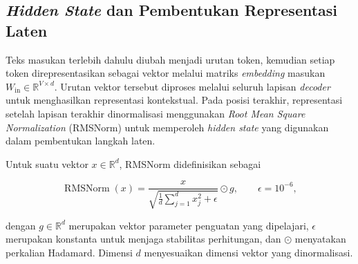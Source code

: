 \subsection{\textit{Hidden State} dan Pembentukan Representasi Laten}
\label{subsec:m-hidden-state}

Teks masukan terlebih dahulu diubah menjadi urutan token, kemudian setiap token direpresentasikan sebagai vektor melalui matriks \textit{embedding} masukan $W_{\mathrm{in}}\in\mathbb{R}^{V\times d}$. Urutan vektor tersebut diproses melalui seluruh lapisan \textit{decoder} untuk menghasilkan representasi kontekstual. Pada posisi terakhir, representasi setelah lapisan terakhir dinormalisasi menggunakan \textit{Root Mean Square Normalization} (RMSNorm) untuk memperoleh \textit{hidden state} yang digunakan dalam pembentukan langkah laten.

Untuk suatu vektor $x\in\mathbb{R}^{d}$, RMSNorm didefinisikan sebagai

\begin{equation}
\operatorname{RMSNorm}(x)
=
\frac{x}{
\sqrt{
\frac{1}{d}\sum_{j=1}^{d}x_j^2+\epsilon
}
}
\odot g,
\qquad
\epsilon=10^{-6},
\label{eq:m-arch-rmsnorm}
\end{equation}

dengan $g\in\mathbb{R}^{d}$ merupakan vektor parameter penguatan yang dipelajari, $\epsilon$ merupakan konstanta untuk menjaga stabilitas perhitungan, dan $\odot$ menyatakan perkalian Hadamard. Dimensi $d$ menyesuaikan dimensi vektor yang dinormalisasi.


